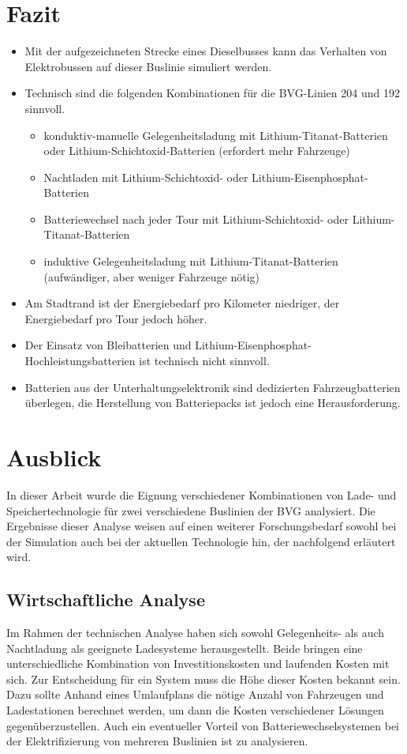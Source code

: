 \section{Fazit}
\begin{itemize}
	\item Mit der aufgezeichneten Strecke eines Dieselbusses kann das Verhalten von Elektrobussen auf dieser Buslinie simuliert werden.
	\item Technisch sind die folgenden Kombinationen für die BVG-Linien 204 und 192 sinnvoll.
	\begin{itemize} 
		\item konduktiv-manuelle Gelegenheitsladung mit Lithium-Titanat-Batterien oder Lithium-Schichtoxid-Batterien (erfordert mehr Fahrzeuge)
		\item Nachtladen mit Lithium-Schichtoxid- oder Lithium-Eisenphosphat-Batterien
		\item Batteriewechsel nach jeder Tour mit Lithium-Schichtoxid- oder Lithium-Titanat-Batterien
		\item induktive Gelegenheitsladung mit Lithium-Titanat-Batterien (aufwändiger, aber weniger Fahrzeuge nötig)
	\end{itemize}
	\item Am Stadtrand ist der Energiebedarf pro Kilometer niedriger, der Energiebedarf pro Tour jedoch höher.
	\item Der Einsatz von Bleibatterien und Lithium-Eisenphosphat-Hochleistungsbatterien ist technisch nicht sinnvoll.
	\item Batterien aus der Unterhaltungselektronik sind dedizierten Fahrzeugbatterien überlegen, die Herstellung von Batteriepacks ist jedoch eine Herausforderung.
\end{itemize}

\section{Ausblick}
In dieser Arbeit wurde die Eignung verschiedener Kombinationen von Lade- und Speichertechnologie für zwei verschiedene Buslinien der BVG analysiert. Die Ergebnisse dieser Analyse weisen auf einen weiterer Forschungsbedarf sowohl bei der Simulation auch bei der aktuellen Technologie hin, der nachfolgend erläutert wird.

\subsection{Wirtschaftliche Analyse}
Im Rahmen der technischen Analyse haben sich sowohl Gelegenheits- als auch Nachtladung als geeignete Ladesysteme herausgestellt. Beide bringen eine unterschiedliche Kombination von Investitionskosten und laufenden Kosten mit sich. Zur Entscheidung für ein System muss die Höhe dieser Kosten bekannt sein. Dazu sollte Anhand eines Umlaufplans die nötige Anzahl von Fahrzeugen und Ladestationen berechnet werden, um dann die Kosten verschiedener Lösungen gegenüberzustellen. Auch ein eventueller Vorteil von Batteriewechselsystemen bei der Elektrifizierung von mehreren Buslinien ist zu analysieren.

